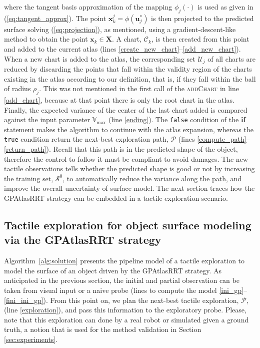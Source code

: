 where the tangent basis approximation of the mapping $\phi_j(\cdot)$ is used as given in (\ref{eq:tangent_approx}). The point $\mathbf{x}_k^j = \phi(\mathbf{u}_{j}^*)$ is then projected to the predicted surface solving (\ref{eq:projection}), as mentioned, using a gradient-descent-like method to obtain the point $\mathbf{x}_k \in \mathbf{X}$. A chart, $\mathcal{C}_k$, is then created from this point and added to the current atlas (lines \ref{create_new_chart}--\ref{add_new_chart}). When a new chart is added to the atlas, the corresponding set $\mathcal{U}_j$ of all charts are reduced by discarding the points that fall within the validity region of the charts existing in the atlas according to our definition, that is, if they fall within the ball of radius $\rho_j$. This was not mentioned in the first call of the \textsc{addChart} in line \ref{add_chart}, because at that point there is only the root chart in the atlas. Finally, the expected variance of the center of the last chart added is compared against the input parameter $\mathbb{V}_{\max}$ (line \ref{ending}). The \texttt{false} condition of the \textbf{if} statement makes the algorithm to continue with the atlas expansion, whereas the \texttt{true} condition return the next-best exploration path, $\mathcal{P}$ (lines \ref{compute_path}--\ref{return_path}). Recall that this path is in the predicted shape of the object, therefore the control to follow it must be compliant to avoid damages. The new tactile observations tells whether the predicted shape is good or not by increasing the training set, $\mathcal{S}^0$, to automatically reduce the variance along the path, and improve the overall uncertainty of surface model. The next section traces how the GPAtlasRRT strategy can be embedded in a tactile exploration scenario.

\subsection{Tactile exploration for object surface modeling via the GPAtlasRRT strategy}
\label{sec:gpatlasrrt_tactile_exploration}

Algorithm~\ref{alg:solution} presents the pipeline model of a tactile exploration to model the surface of an object driven by the GPAtlasRRT strategy. As anticipated in the previous section, the initial and partial observation can be taken from visual input or a naive probe (lines to compute the model \ref{ini_gp}--\ref{fini_ini_gp}). From this point on, we plan the next-best tactile exploration, $\mathcal{P}$, (line \ref{exploration}), and pass this information to the exploratory probe. Please, note that this exploration can done by a real robot or simulated given a ground truth, a notion that is used for the method validation in Section \ref{sec:experiments}.

